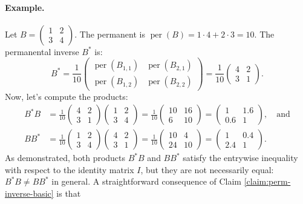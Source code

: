 \documentclass[11pt]{article}
\theoremstyle{definition}
\DeclareMathOperator{\per}{per}
\begin{document}
\paragraph{Example.}
Let $B = \begin{pmatrix} 1 & 2 \\ 3 & 4 \end{pmatrix}$. The permanent is $\per(B) = 1 \cdot 4 + 2 \cdot 3 = 10$.
The permanental inverse $B^*$ is:
\begin{equation*}
	B^* = \frac{1}{10} \begin{pmatrix} \per(B_{1,1}) & \per(B_{2,1}) \\ \per(B_{1,2}) & \per(B_{2,2}) \end{pmatrix} = \frac{1}{10} \begin{pmatrix} 4 & 2 \\ 3 & 1 \end{pmatrix}.
\end{equation*}
Now, let's compute the products:
\begin{align*}
	B^*B &= \frac{1}{10} \begin{pmatrix} 4 & 2 \\ 3 & 1 \end{pmatrix} \begin{pmatrix} 1 & 2 \\ 3 & 4 \end{pmatrix} = \frac{1}{10} \begin{pmatrix} 10 & 16 \\ 6 & 10 \end{pmatrix} = \begin{pmatrix} 1 & 1.6 \\ 0.6 & 1 \end{pmatrix}, \quad \text{and} \\
	BB^* &= \frac{1}{10} \begin{pmatrix} 1 & 2 \\ 3 & 4 \end{pmatrix} \begin{pmatrix} 4 & 2 \\ 3 & 1 \end{pmatrix} = \frac{1}{10} \begin{pmatrix} 10 & 4 \\ 24 & 10 \end{pmatrix} = \begin{pmatrix} 1 & 0.4 \\ 2.4 & 1 \end{pmatrix}.
\end{align*}
As demonstrated, both products \( B^*B \) and \( BB^* \) satisfy the entrywise inequality with respect to the identity matrix \( I \), but they are not necessarily equal: \( B^*B \neq BB^* \) in general. A straightforward consequence of Claim \ref{claim:perm-inverse-basic} is that
\end{document}

